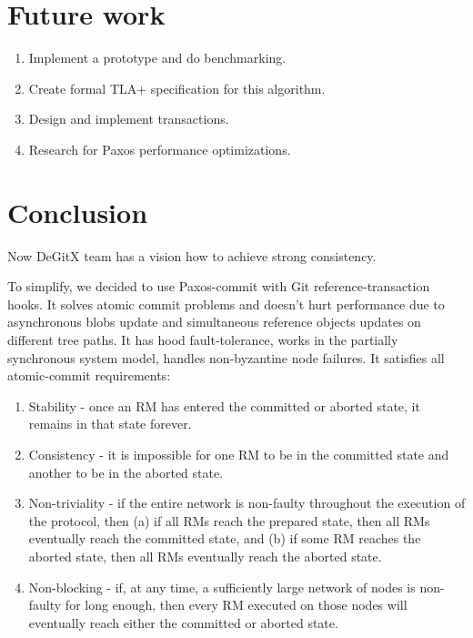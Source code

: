 \documentclass[sigplan, screen, nonacm, 11pt]{acmart}
\begin{document}
\section{Future work}

\begin{enumerate}
  \item Implement a prototype and do benchmarking.
  \item Create formal TLA+ specification for this algorithm.
  \item Design and implement transactions.
  \item Research for Paxos performance optimizations.
\end{enumerate}

\section{Conclusion}

Now DeGitX team has a vision how to achieve strong consistency.

To simplify, we decided to use Paxos-commit with Git reference-transaction hooks.
It solves atomic commit problems and doesn't hurt performance due to asynchronous blobs update
and simultaneous reference objects updates on different tree paths.
It has hood fault-tolerance, works in the partially synchronous system model,
handles non-byzantine node failures. It satisfies all atomic-commit requirements:

\begin{enumerate}
  \item Stability - once an RM has entered the committed or aborted state, it remains in that state forever.
  \item Consistency - it is impossible for one RM to be in the committed state and another to be in
  the aborted state.
  \item Non-triviality - if the entire network is non-faulty throughout the execution of the protocol,
  then (a) if all RMs reach the prepared state, then all RMs eventually reach the committed state,
  and (b) if some RM reaches the aborted state,  then all RMs eventually reach the aborted state.
  \item Non-blocking - if, at any time, a sufficiently large network of nodes is non-faulty for long enough,
  then every RM executed on those nodes will eventually reach either the committed or aborted state.
\end{enumerate}

\newpage



\end{document}
